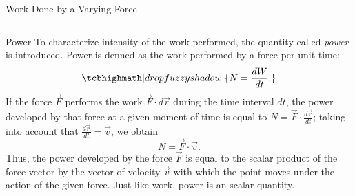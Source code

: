 \documentclass[18pt]{LectMechanics}
\begin{document}
\begin{frame}{Work Done by a Varying Force}{}
\begin{columns}
\begin{column}[T]{0.3\linewidth}
\begin{center}
			\end{center}
		\end{column}
	\end{columns}
\end{frame}

\begin{frame}{Power}{}
	To characterize intensity of the work performed, the quantity called \emph{power} is introduced. Power is denned as the work performed by a force per unit time:
	\begin{equation*}
		\tcbhighmath[drop fuzzy shadow]{N = \frac{dW}{dt}.}
	\end{equation*}
	If the force $\vec F$ performs the work $ \vec F \cdot d\vec r$ during the time interval $dt$, the power developed by that force at a given moment of time is equal to $N = \vec F \cdot \frac{d\vec r}{dt}$; taking into account that $\frac{d\vec r}{dt} = \vec v$, we obtain
	\begin{equation*}
		N = \vec F \cdot \vec v.
	\end{equation*}
	Thus, the power developed by the force $ \vec F $ is equal to the scalar product of the force vector by the vector of velocity $ \vec v $ with which the point moves under the action of the given force. Just like work, power is an scalar quantity.

\end{frame}
\end{document}
